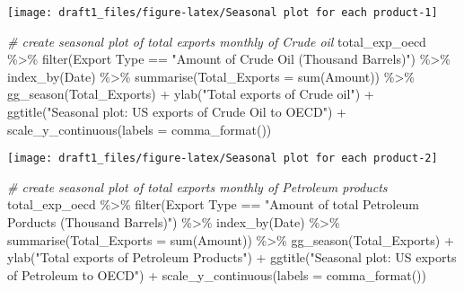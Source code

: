 \documentclass[
]{article}
\newenvironment{Shaded}{\begin{snugshade}}{\end{snugshade}}
\newcommand{\AttributeTok}[1]{\textcolor[rgb]{0.77,0.63,0.00}{#1}}
\newcommand{\CommentTok}[1]{\textcolor[rgb]{0.56,0.35,0.01}{\textit{#1}}}
\newcommand{\FunctionTok}[1]{\textcolor[rgb]{0.00,0.00,0.00}{#1}}
\newcommand{\NormalTok}[1]{#1}
\newcommand{\SpecialCharTok}[1]{\textcolor[rgb]{0.00,0.00,0.00}{#1}}
\newcommand{\StringTok}[1]{\textcolor[rgb]{0.31,0.60,0.02}{#1}}
\begin{document}
\begin{center}\texttt{[image: draft1\_files/figure-latex/Seasonal plot for each product-1]} \end{center}

\begin{Shaded}
\begin{Highlighting}[]
\CommentTok{\# create seasonal plot of total exports monthly of Crude oil}
\NormalTok{total\_exp\_oecd }\SpecialCharTok{\%\textgreater{}\%} \FunctionTok{filter}\NormalTok{(}\StringTok{\textasciigrave{}}\AttributeTok{Export Type}\StringTok{\textasciigrave{}} \SpecialCharTok{==} \StringTok{"Amount of Crude Oil (Thousand Barrels)"}\NormalTok{) }\SpecialCharTok{\%\textgreater{}\%} 
  \FunctionTok{index\_by}\NormalTok{(Date) }\SpecialCharTok{\%\textgreater{}\%} 
  \FunctionTok{summarise}\NormalTok{(}\AttributeTok{Total\_Exports =} \FunctionTok{sum}\NormalTok{(}\StringTok{\textasciigrave{}}\AttributeTok{Amount}\StringTok{\textasciigrave{}}\NormalTok{)) }\SpecialCharTok{\%\textgreater{}\%} 
  \FunctionTok{gg\_season}\NormalTok{(Total\_Exports) }\SpecialCharTok{+}
  \FunctionTok{ylab}\NormalTok{(}\StringTok{"Total exports  of Crude oil"}\NormalTok{) }\SpecialCharTok{+}
  \FunctionTok{ggtitle}\NormalTok{(}\StringTok{"Seasonal plot: US exports of Crude Oil to OECD"}\NormalTok{) }\SpecialCharTok{+}
  \FunctionTok{scale\_y\_continuous}\NormalTok{(}\AttributeTok{labels =} \FunctionTok{comma\_format}\NormalTok{())}
\end{Highlighting}
\end{Shaded}

\begin{center}\texttt{[image: draft1\_files/figure-latex/Seasonal plot for each product-2]} \end{center}

\begin{Shaded}
\begin{Highlighting}[]
\CommentTok{\# create seasonal plot of total exports monthly of Petroleum products}
\NormalTok{total\_exp\_oecd }\SpecialCharTok{\%\textgreater{}\%} \FunctionTok{filter}\NormalTok{(}\StringTok{\textasciigrave{}}\AttributeTok{Export Type}\StringTok{\textasciigrave{}} \SpecialCharTok{==} \StringTok{"Amount of total Petroleum Porducts (Thousand Barrels)"}\NormalTok{) }\SpecialCharTok{\%\textgreater{}\%} 
  \FunctionTok{index\_by}\NormalTok{(Date) }\SpecialCharTok{\%\textgreater{}\%} 
  \FunctionTok{summarise}\NormalTok{(}\AttributeTok{Total\_Exports =} \FunctionTok{sum}\NormalTok{(}\StringTok{\textasciigrave{}}\AttributeTok{Amount}\StringTok{\textasciigrave{}}\NormalTok{)) }\SpecialCharTok{\%\textgreater{}\%} 
  \FunctionTok{gg\_season}\NormalTok{(Total\_Exports) }\SpecialCharTok{+}
  \FunctionTok{ylab}\NormalTok{(}\StringTok{"Total exports  of Petroleum Products"}\NormalTok{) }\SpecialCharTok{+}
  \FunctionTok{ggtitle}\NormalTok{(}\StringTok{"Seasonal plot: US exports of Petroleum to OECD"}\NormalTok{) }\SpecialCharTok{+}
  \FunctionTok{scale\_y\_continuous}\NormalTok{(}\AttributeTok{labels =} \FunctionTok{comma\_format}\NormalTok{())}
\end{Highlighting}
\end{Shaded}
\end{document}
